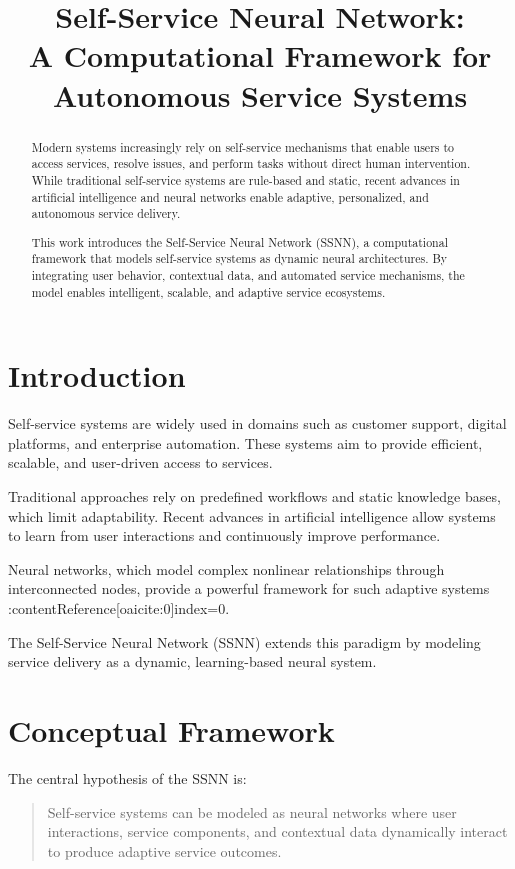 \documentclass[12pt]{article}
\title{\textbf{Self-Service Neural Network: \\ A Computational Framework for Autonomous Service Systems}}
\author{}
\date{}
\begin{document}
\maketitle

\begin{abstract}
Modern systems increasingly rely on self-service mechanisms that enable users to access services, resolve issues, and perform tasks without direct human intervention. While traditional self-service systems are rule-based and static, recent advances in artificial intelligence and neural networks enable adaptive, personalized, and autonomous service delivery.

This work introduces the Self-Service Neural Network (SSNN), a computational framework that models self-service systems as dynamic neural architectures. By integrating user behavior, contextual data, and automated service mechanisms, the model enables intelligent, scalable, and adaptive service ecosystems.
\end{abstract}

\section{Introduction}

Self-service systems are widely used in domains such as customer support, digital platforms, and enterprise automation. These systems aim to provide efficient, scalable, and user-driven access to services.

Traditional approaches rely on predefined workflows and static knowledge bases, which limit adaptability. Recent advances in artificial intelligence allow systems to learn from user interactions and continuously improve performance.

Neural networks, which model complex nonlinear relationships through interconnected nodes, provide a powerful framework for such adaptive systems :contentReference[oaicite:0]{index=0}.

The Self-Service Neural Network (SSNN) extends this paradigm by modeling service delivery as a dynamic, learning-based neural system.

\section{Conceptual Framework}

The central hypothesis of the SSNN is:

\begin{quote}
Self-service systems can be modeled as neural networks where user interactions, service components, and contextual data dynamically interact to produce adaptive service outcomes.
\end{quote}
\end{document}
